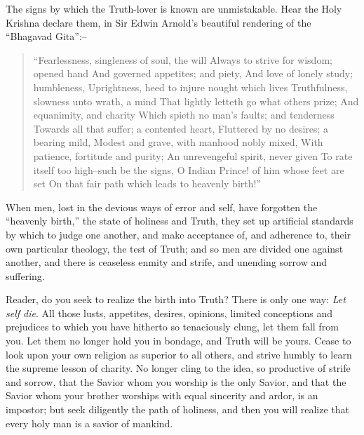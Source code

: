\documentclass[12pt,oneside]{scrbook}
\begin{document}
  The signs by which the Truth-lover is known are unmistakable. Hear the
  Holy Krishna declare them, in Sir Edwin Arnold's beautiful rendering of
  the ``Bhagavad Gita'':--
  
  \begin{quote}
  ``Fearlessness, singleness of soul, the will Always to strive for
  wisdom; opened hand And governed appetites; and piety, And love of
  lonely study; humbleness, Uprightness, heed to injure nought which lives
  Truthfulness, slowness unto wrath, a mind That lightly letteth go what
  others prize; And equanimity, and charity Which spieth no man's faults;
  and tenderness Towards all that suffer; a contented heart, Fluttered by
  no desires; a bearing mild, Modest and grave, with manhood nobly mixed,
  With patience, fortitude and purity; An unrevengeful spirit, never given
  To rate itself too high--such be the signs, O Indian Prince! of him
  whose feet are set On that fair path which leads to heavenly birth!''
  \end{quote}
  
  When men, lost in the devious ways of error and self, have forgotten the
  ``heavenly birth,'' the state of holiness and Truth, they set up
  artificial standards by which to judge one another, and make acceptance
  of, and adherence to, their own particular theology, the test of Truth;
  and so men are divided one against another, and there is ceaseless
  enmity and strife, and unending sorrow and suffering.
  
  Reader, do you seek to realize the birth into Truth? There is only one
  way: \emph{Let self die}. All those lusts, appetites, desires, opinions,
  limited conceptions and prejudices to which you have hitherto so
  tenaciously clung, let them fall from you. Let them no longer hold you
  in bondage, and Truth will be yours. Cease to look upon your own
  religion as superior to all others, and strive humbly to learn the
  supreme lesson of charity. No longer cling to the idea, so productive of
  strife and sorrow, that the Savior whom you worship is the only Savior,
  and that the Savior whom your brother worships with equal sincerity and
  ardor, is an impostor; but seek diligently the path of holiness, and
  then you will realize that every holy man is a savior of mankind.
  
\end{document}
